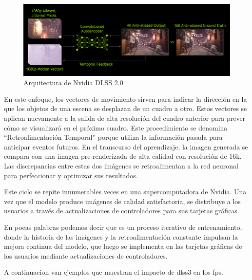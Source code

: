 \documentclass[runningheads]{llncs} %
\begin{document}
\begin{figure}
    \centering
    \includegraphics[scale=0.4]{dlss.jpg}
    \caption{Arquitectura de Nvidia DLSS 2.0 \cite{ej-dlss2}}
    \label{fig:arquitectura-dlss}
\end{figure}

En este enfoque, los vectores de movimiento sirven para indicar la dirección 
en la que los objetos de una escena se desplazan de un cuadro a otro. 
Estos vectores se aplican nuevamente a la salida de alta resolución 
del cuadro anterior para prever cómo se visualizará en el próximo cuadro. 
Este procedimiento se denomina 
\textquotedblleft{}Retroalimentación Temporal\textquotedblright{}
porque utiliza la información pasada para anticipar eventos futuros. 
En el transcurso del aprendizaje, la imagen generada se compara con una 
imagen pre-renderizada de alta calidad con resolución de 16k.
Las discrepancias entre estas dos imágenes se retroalimentan a la red neuronal 
para perfeccionar y optimizar sus resultados. \cite{ej-dlss2}

Este ciclo se repite innumerables veces en una supercomputadora de Nvidia. 
Una vez que el modelo produce imágenes de calidad satisfactoria, 
se distribuye a los usuarios a través de actualizaciones de controladores 
para sus tarjetas gráficas. \cite{ej-dlss2}

En pocas palabras podemos decir que es un proceso iterativo de entrenamiento, 
donde la historia de las imágenes y la retroalimentación constante impulsan 
la mejora continua del modelo, que luego se implementa en las tarjetas gráficas 
de los usuarios mediante actualizaciones de controladores. 

A continuacion van ejemplos que muestran el impacto de dlss3 en los fps.
\end{document}
